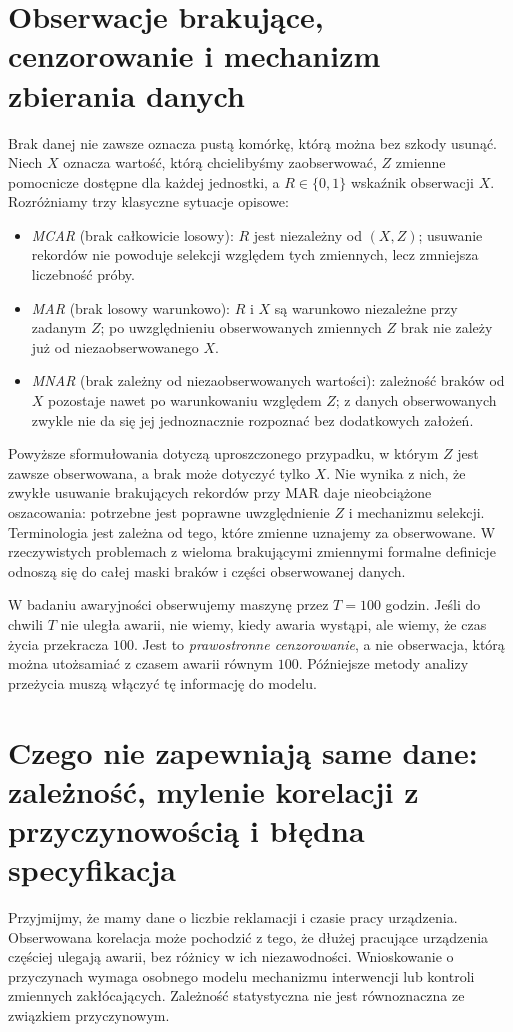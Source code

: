 \section{Obserwacje brakujące, cenzorowanie i mechanizm zbierania danych}
Brak danej nie zawsze oznacza pustą komórkę, którą można bez szkody usunąć. Niech $X$ oznacza wartość, którą chcielibyśmy zaobserwować, $Z$ zmienne pomocnicze dostępne dla każdej jednostki, a $R\in\{0,1\}$ wskaźnik obserwacji $X$. Rozróżniamy trzy klasyczne sytuacje opisowe:
\begin{itemize}
\item \emph{MCAR} (brak całkowicie losowy): $R$ jest niezależny od $(X,Z)$; usuwanie rekordów nie powoduje selekcji względem tych zmiennych, lecz zmniejsza liczebność próby.
\item \emph{MAR} (brak losowy warunkowo): $R$ i $X$ są warunkowo niezależne przy zadanym $Z$; po uwzględnieniu obserwowanych zmiennych $Z$ brak nie zależy już od niezaobserwowanego $X$.
\item \emph{MNAR} (brak zależny od niezaobserwowanych wartości): zależność braków od $X$ pozostaje nawet po warunkowaniu względem $Z$; z danych obserwowanych zwykle nie da się jej jednoznacznie rozpoznać bez dodatkowych założeń.
\end{itemize}
Powyższe sformułowania dotyczą uproszczonego przypadku, w którym $Z$ jest zawsze obserwowana, a brak może dotyczyć tylko $X$. Nie wynika z nich, że zwykłe usuwanie brakujących rekordów przy MAR daje nieobciążone oszacowania: potrzebne jest poprawne uwzględnienie $Z$ i mechanizmu selekcji. Terminologia jest zależna od tego, które zmienne uznajemy za obserwowane. W rzeczywistych problemach z wieloma brakującymi zmiennymi formalne definicje odnoszą się do całej maski braków i części obserwowanej danych.

\begin{przyklad}
W badaniu awaryjności obserwujemy maszynę przez $T=100$ godzin. Jeśli do chwili $T$ nie uległa awarii, nie wiemy, kiedy awaria wystąpi, ale wiemy, że czas życia przekracza $100$. Jest to \emph{prawostronne cenzorowanie}, a nie obserwacja, którą można utożsamiać z czasem awarii równym $100$. Późniejsze metody analizy przeżycia muszą włączyć tę informację do modelu.
\end{przyklad}

\section{Czego nie zapewniają same dane: zależność, mylenie korelacji z przyczynowością i błędna specyfikacja}
Przyjmijmy, że mamy dane o liczbie reklamacji i czasie pracy urządzenia. Obserwowana korelacja może pochodzić z tego, że dłużej pracujące urządzenia częściej ulegają awarii, bez różnicy w ich niezawodności. Wnioskowanie o przyczynach wymaga osobnego modelu mechanizmu interwencji lub kontroli zmiennych zakłócających. Zależność statystyczna nie jest równoznaczna ze związkiem przyczynowym.

